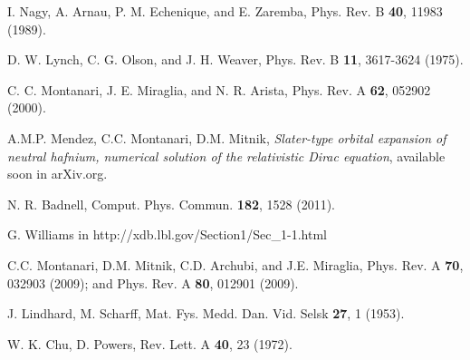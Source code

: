 \documentclass[aps,pra,reprint,superscriptaddress]{revtex4-1}
\begin{document}
\begin{thebibliography}{00}
I. Nagy, A. Arnau, P. M. Echenique, and E. Zaremba, 
Phys. Rev. B \textbf{40}, 11983 (1989).

D. W. Lynch, C. G. Olson, and J. H. Weaver, 
Phys. Rev. B \textbf{11}, 3617-3624 (1975).

C. C. Montanari, J. E. Miraglia, and N. R. Arista, 
Phys. Rev. A \textbf{62}, 052902 (2000).

A.M.P. Mendez, C.C. Montanari, D.M. Mitnik, 
\textit{Slater-type orbital expansion of neutral hafnium, numerical 
solution of the relativistic Dirac equation}, 
available soon in arXiv.org. 

N. R. Badnell, Comput. Phys. Commun. \textbf{182}, 1528 (2011).

G. Williams in http://xdb.lbl.gov/Section1/Sec\_1-1.html


C.C. Montanari, D.M. Mitnik, C.D. Archubi, and J.E. Miraglia, 
Phys. Rev. A \textbf{70}, 032903 (2009); 
and Phys. Rev. A \textbf{80}, 012901 (2009).

J. Lindhard, M. Scharff,  
Mat. Fys. Medd. Dan. Vid. Selsk  \textbf{27}, 1 (1953).

W. K. Chu, D. Powers, 
Rev. Lett. A \textbf{40}, 23 (1972).




\end{thebibliography}
\end{document}
